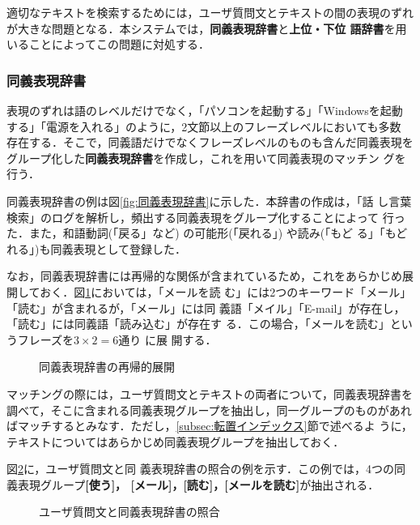 適切なテキストを検索するためには，ユーザ質問文とテキストの間の表現のずれ
が大きな問題となる．本システムでは，{\bf 同義表現辞書}と{\bf 上位・下位
語辞書}を用いることによってこの問題に対処する．


\subsubsection{同義表現辞書} \label{subsubsec:同義表現辞書}

表現のずれは語のレベルだけでなく，「パソコンを起動する」「Windowsを起動
する」「電源を入れる」のように，2文節以上のフレーズレベルにおいても多数
存在する．そこで，同義語だけでなくフレーズレベルのものも含んだ同義表現を
グループ化した{\bf 同義表現辞書}を作成し，これを用いて同義表現のマッチン
グを行う．

同義表現辞書の例は図\ref{fig:同義表現辞書}に示した．本辞書の作成は，「話
し言葉検索」のログを解析し，頻出する同義表現をグループ化することによって
行った．また，和語動詞(「戻る」など) の可能形(「戻れる」) や読み(「もど
る」「もどれる」)も同義表現として登録した．


なお，同義表現辞書には再帰的な関係が含まれているため，これをあらかじめ展
開しておく．図\ref{fig:同義表現辞書の再帰的展開}においては，「メールを読
む」には2つのキーワード「メール」「読む」が含まれるが，「メール」には同
義語「メイル」「E-mail」が存在し，「読む」には同義語「読み込む」が存在す
る．この場合，「メールを読む」というフレーズを$3 \times 2 = 6 通り$ に展
開する．


\begin{figure}
 \begin{center}
 \caption{同義表現辞書の再帰的展開} 
\label{fig:同義表現辞書の再帰的展開}
 \end{center}
\end{figure}


マッチングの際には，ユーザ質問文とテキストの両者について，同義表現辞書を
調べて，そこに含まれる同義表現グループを抽出し，同一グループのものがあれ
ばマッチするとみなす．ただし，\ref{subsec:転置インデックス}節で述べるよ
うに，テキストについてはあらかじめ同義表現グループを抽出しておく．

図\ref{fig:ユーザ質問文と同義表現データベースの照合}に，ユーザ質問文と同
義表現辞書の照合の例を示す．この例では，4つの同義表現グループ{\bf [使う]，
[メール]，[読む]，[メールを読む]}が抽出される．

\begin{figure}
 \begin{center}
  \caption{ユーザ質問文と同義表現辞書の照合}  \label{fig:ユーザ質問文と同義表現データベースの照合}
  \end{center}
\end{figure}



